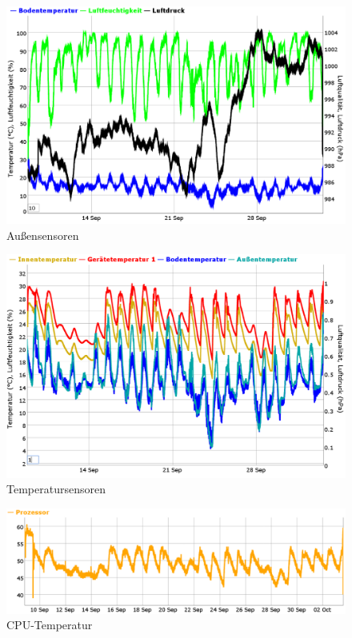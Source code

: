 \begin{figure}[p]
  \centering
     \includegraphics[width=0.95\textheight, angle=90]{figures/auswertung-aussen.png}
  \caption{Außensensoren}
  \label{fig:auswertung-aussen}
\end{figure}

\begin{figure}[p]
  \centering
     \includegraphics[width=0.95\textheight, angle=90]{figures/auswertung-temperaturen.png}
  \caption{Temperatursensoren}
  \label{fig:auswertung-temperaturen}
\end{figure}

\begin{figure}[h]
  \centering
     \includegraphics[width=\textwidth]{figures/auswertung-cpu.png}
  \caption{\gls{CPU}-Temperatur}
  \label{fig:auswertung-cpu}
\end{figure}

